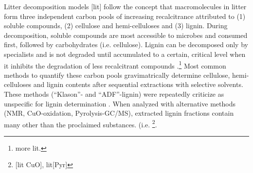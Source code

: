 \documentclass[authoryear,preprint,review,12pt]{elsarticle}
\begin{document}

Litter decomposition models [lit] follow the concept that macromolecules in litter form three independent carbon pools of increasing recalcitrance attributed to (1) soluble compounds, (2) cellulose and hemi-celluloses and (3) lignin. During decomposition, soluble compounds are most accessible to microbes and consumed first, followed by carbohydrates (i.e. cellulose). Lignin can be decomposed only by specialists and is not degraded until accumulated to a certain, critical level when it inhibits the degradation of less recalcitrant compounds \citep{Berg1980, Couteaux1995, Moorhead2006}.\footnote{more lit.} Most common methods to quantify these carbon pools gravimatrically determine cellulose, hemi-celluloses and lignin contents after sequential extractions with selective solvents. These methods (``Klason''- and ``ADF''-lignin) were repeatedly criticize as unspecific for lignin determination \citep{i.e. Hatfield2005}. When analyzed with alternative methods (NMR, CuO-oxidation, Pyrolysis-GC/MS), extracted lignin fractions contain many other than the proclaimed substances. (i.e. \cite{Preston1997} \footnote{[lit CuO], lit[Pyr]}. %
\end{document}
